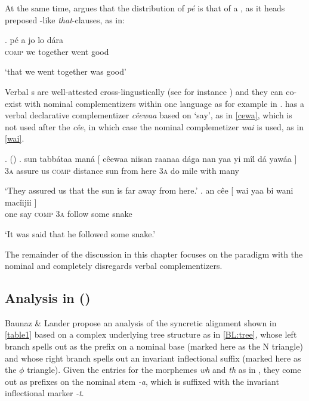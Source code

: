 At the same time, \citet[76]{Lawal1991} argues that the distribution of \textit{p\'e} is that of a , as it heads preposed -like \textit{that}-clauses, as in:

\exg.
p\'e a jo lo d\'ara\\
\textsc{comp} we together went good\\
\strut `that we went together was good' 

Verbal s are well-attested cross-lingustically (see for instance \citealt{DixonAik2006}) and they can co-exist with nominal complementizers within one language as for example in .  has a verbal declarative complementizer \textit{c\^eewaa} based on `say', as in \ref{cewa}, which is not used after the   \textit{c\^ee}, in which case  the nominal complemetizer \textit{wai} is used, as in \ref{wai}.

\ex.  (\citealt[96--97]{Dimm1989})\label{Hausa}
\ag. sun tabb\'ataa man\'a [ c\^eewaa niisan raanaa d\'aga nan yaa yi m\^il d\'a {yaw\'aa ]}\\
\textsc{3a} assure us {} \textsc{comp} distance sun from here \textsc{3a} do mile with {many }\\
\strut `They assured us that the sun is far away from here.'\label{cewa}
\bg. an c\^ee [ wai yaa bi wani {mac\v{i}ijii ]}\\
one say {} \textsc{comp} \textsc{3a} follow some {snake }\\
\strut `It was said that he followed some snake.' \label{wai}

The remainder of the discussion in this chapter focuses on the paradigm with the nominal  and completely disregards verbal complementizers.

\subsection{Analysis in \citeauthor{BaunazLander2017} (\citeyear{BaunazLander2017,BaunazLander2018})}

Baunaz \& Lander propose an analysis of the syncretic alignment shown in \ref{table1} 
based on a complex underlying tree structure as in \ref{BL:tree}, whose left branch spells out as the prefix on a nominal base (marked here as the N triangle) and whose right branch spells out an invariant inflectional suffix (marked here as the $\phi$ triangle). Given the entries  for the  morphemes \textit{wh} and \textit{th} as in \Next, they come out as prefixes on the nominal stem \textit{-a}, which is suffixed with the invariant inflectional marker \textit{-t}.

